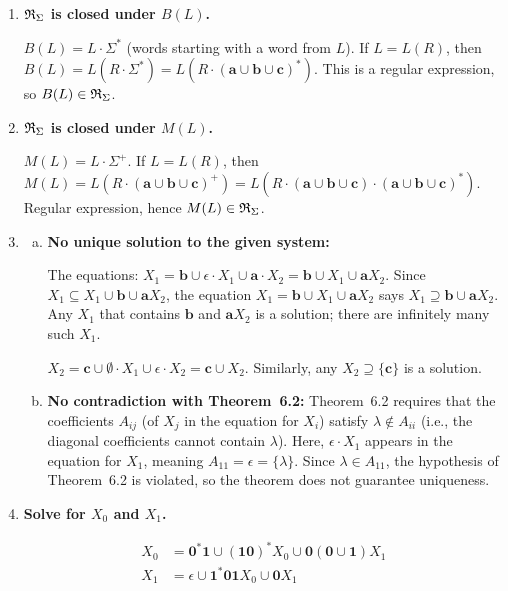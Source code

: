 \begin{enumerate}[{6.}1.]
\item \textbf{$\mathfrak{R}_\Sigma$ is closed under $B(L)$.}

$B(L)=L\cdot\Sigma^*$ (words starting with a word from $L$).  If $L=L(R)$, then $B(L)=L(R\cdot\Sigma^*)=L(R\cdot(\pmb{a}\cup\pmb{b}\cup\pmb{c})^*)$.  This is a regular expression, so $B(L)\in\mathfrak{R}_\Sigma$.

\item \textbf{$\mathfrak{R}_\Sigma$ is closed under $M(L)$.}

$M(L)=L\cdot\Sigma^+$.  If $L=L(R)$, then $M(L)=L(R\cdot(\pmb{a}\cup\pmb{b}\cup\pmb{c})^+)=L(R\cdot(\pmb{a}\cup\pmb{b}\cup\pmb{c})\cdot(\pmb{a}\cup\pmb{b}\cup\pmb{c})^*)$.  Regular expression, hence $M(L)\in\mathfrak{R}_\Sigma$.

\item \begin{enumerate}[(a)]
  \item \textbf{No unique solution to the given system:}

  The equations:
  $X_1=\pmb{b}\cup\epsilon\cdot X_1\cup\pmb{a}\cdot X_2=\pmb{b}\cup X_1\cup\pmb{a}X_2$.
  Since $X_1\subseteq X_1\cup\pmb{b}\cup\pmb{a}X_2$, the equation $X_1=\pmb{b}\cup X_1\cup\pmb{a}X_2$ says $X_1\supseteq\pmb{b}\cup\pmb{a}X_2$.  Any $X_1$ that contains $\pmb{b}$ and $\pmb{a}X_2$ is a solution; there are infinitely many such $X_1$.

  $X_2=\pmb{c}\cup\emptyset\cdot X_1\cup\epsilon\cdot X_2=\pmb{c}\cup X_2$.  Similarly, any $X_2\supseteq\{\pmb{c}\}$ is a solution.

  \item \textbf{No contradiction with Theorem~6.2:}  Theorem~6.2 requires that the coefficients $A_{ij}$ (of $X_j$ in the equation for $X_i$) satisfy $\lambda\notin A_{ii}$ (i.e., the diagonal coefficients cannot contain $\lambda$).  Here, $\epsilon\cdot X_1$ appears in the equation for $X_1$, meaning $A_{11}=\epsilon=\{\lambda\}$.  Since $\lambda\in A_{11}$, the hypothesis of Theorem~6.2 is violated, so the theorem does not guarantee uniqueness.
\end{enumerate}

\item \textbf{Solve for $X_0$ and $X_1$.}

\begin{align*}
  X_0 &= \pmb{0}^*\pmb{1} \cup (\pmb{10})^*X_0 \cup \pmb{0}(\pmb{0}\cup\pmb{1})X_1 \\
  X_1 &= \epsilon \cup \pmb{1}^*\pmb{01}X_0 \cup \pmb{0}X_1
\end{align*}


\end{enumerate}
